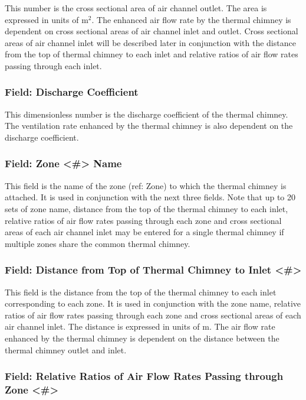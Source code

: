 This number is the cross sectional area of air channel outlet. The area is expressed in units of m\(^{2}\). The enhanced air flow rate by the thermal chimney is dependent on cross sectional areas of air channel inlet and outlet. Cross sectional areas of air channel inlet will be described later in conjunction with the distance from the top of thermal chimney to each inlet and relative ratios of air flow rates passing through each inlet.

\subsubsection{Field: Discharge Coefficient}\label{field-discharge-coefficient-000}

This dimensionless number is the discharge coefficient of the thermal chimney. The ventilation rate enhanced by the thermal chimney is also dependent on the discharge coefficient.

\subsubsection{Field: Zone \textless{}\#\textgreater{} Name}\label{field-zone-name-8}

This field is the name of the zone (ref: Zone) to which the thermal chimney is attached. It is used in conjunction with the next three fields. Note that up to 20 sets of zone name, distance from the top of the thermal chimney to each inlet, relative ratios of air flow rates passing through each zone and cross sectional areas of each air channel inlet may be entered for a single thermal chimney if multiple zones share the common thermal chimney.

\subsubsection{Field: Distance from Top of Thermal Chimney to Inlet \textless{}\#\textgreater{}}\label{field-distance-from-top-of-thermal-chimney-to-inlet}

This field is the distance from the top of the thermal chimney to each inlet corresponding to each zone. It is used in conjunction with the zone name, relative ratios of air flow rates passing through each zone and cross sectional areas of each air channel inlet. The distance is expressed in units of m. The air flow rate enhanced by the thermal chimney is dependent on the distance between the thermal chimney outlet and inlet.

\subsubsection{Field: Relative Ratios of Air Flow Rates Passing through Zone \textless{}\#\textgreater{}}\label{field-relative-ratios-of-air-flow-rates-passing-through-zone}

